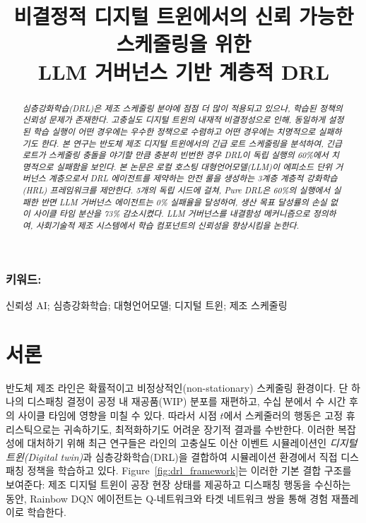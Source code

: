\documentclass[10pt]{article}
\title{비결정적 디지털 트윈에서의 신뢰 가능한 스케줄링을 위한\\
LLM 거버넌스 기반 계층적 DRL}
\date{}
\begin{document}
\maketitle

\begin{abstract}
\textit{%
심층강화학습(DRL)은 제조 스케줄링 분야에 점점 더 많이 적용되고 있으나,
학습된 정책의 신뢰성 문제가 존재한다. 고충실도 디지털 트윈의 내재적 비결정성으로
인해, 동일하게 설정된 학습 실행이 어떤 경우에는 우수한 정책으로 수렴하고
어떤 경우에는 치명적으로 실패하기도 한다.
본 연구는 반도체 제조 디지털 트윈에서의 긴급 로트 스케줄링을 분석하여,
긴급 로트가 스케줄링 충돌을 야기할 만큼 충분히 빈번한 경우
DRL이 독립 실행의 60\%에서 치명적으로 실패함을 보인다.
본 논문은 로컬 호스팅 대형언어모델(LLM)이 에피소드 단위 거버넌스 계층으로서
DRL 에이전트를 제약하는 안전 룰을 생성하는 3계층 계층적 강화학습(HRL) 프레임워크를
제안한다.
5개의 독립 시드에 걸쳐, Pure DRL은 60\%의 실행에서 실패한 반면
LLM 거버넌스 에이전트는 0\% 실패율을 달성하여, 생산 목표 달성률의 손실 없이
사이클 타임 분산을 73\% 감소시켰다.
LLM 거버넌스를 내결함성 메커니즘으로 정의하여, 사회기술적 제조 시스템에서
학습 컴포넌트의 신뢰성을 향상시킴을 논한다.
}
\end{abstract}

\subsubsection*{키워드:}
신뢰성 AI; 심층강화학습; 대형언어모델; 디지털 트윈; 제조 스케줄링

\section{서론}

반도체 제조 라인은 확률적이고 비정상적인(non-stationary) 스케줄링
환경이다. 단 하나의 디스패칭 결정이 공정 내 재공품(WIP) 분포를 재편하고,
수십 분에서 수 시간 후의 사이클 타임에 영향을 미칠 수 있다. 따라서 시점
$t$에서 스케줄러의 행동은 고정 휴리스틱으로는 귀속하기도, 최적화하기도
어려운 장기적 결과를 수반한다\cite{moyne2017,hu2019}. 이러한 복잡성에
대처하기 위해 최근 연구들은 라인의 고충실도 이산 이벤트 시뮬레이션인
\emph{디지털 트윈(Digital twin)}과 심층강화학습(DRL)을 결합하여 시뮬레이션
환경에서 직접 디스패칭 정책을 학습하고 있다\cite{waschneck2018,lee2025}.
Figure~\ref{fig:drl_framework}는 이러한 기본 결합 구조를 보여준다: 제조
디지털 트윈이 공장 현장 상태를 제공하고 디스패칭 행동을 수신하는 동안,
Rainbow DQN 에이전트는 Q-네트워크와 타겟 네트워크 쌍을 통해 경험 재플레이로
학습한다.
\end{document}
